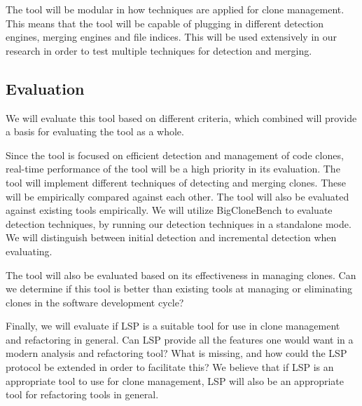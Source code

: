 \documentclass[12pt]{article}
\begin{document}
The tool will be modular in how techniques are applied for clone management. This
means that the tool will be capable of plugging in different detection engines, merging
engines and file indices. This will be used extensively in our research in order to test
multiple techniques for detection and merging.

\subsection{Evaluation}

We will evaluate this tool based on different criteria, which combined will provide a
basis for evaluating the tool as a whole.

Since the tool is focused on efficient detection and management of code clones, real-time
performance of the tool will be a high priority in its evaluation. The tool will implement
different techniques of detecting and merging clones. These will be empirically compared
against each other. The tool will also be evaluated against existing tools empirically. We
will utilize BigCloneBench\cite{BigCloneBench} to evaluate detection techniques, by
running our detection techniques in a standalone mode. We will distinguish between initial
detection and incremental detection when evaluating.

The tool will also be evaluated based on its effectiveness in managing clones. Can we
determine if this tool is better than existing tools at managing or eliminating clones in
the software development cycle?

Finally, we will evaluate if LSP is a suitable tool for use in clone management and
refactoring in general. Can LSP provide all the features one would want in a modern
analysis and refactoring tool? What is missing, and how could the LSP protocol be extended
in order to facilitate this? We believe that if LSP is an appropriate tool to use for
clone management, LSP will also be an appropriate tool for refactoring tools in general.

\newpage


\end{document}
